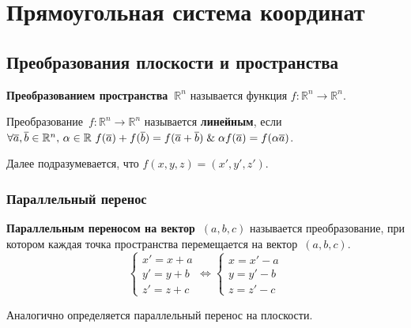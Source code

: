 \section{Прямоугольная система координат}
\subsection{Преобразования плоскости и пространства}
 \textbf{Преобразованием пространства~$\mathbb R^n$} называется функция $f \colon \mathbb R^n \to \mathbb R^n$.

Преобразование~$f \colon \mathbb R^n \to \mathbb R^n$ называется \textbf{линейным}, если $\forall \overline a, \overline b \in \mathbb R^n,\, \alpha \in \mathbb R \ f(\overline a) + f(\overline b) = f(\overline a + \overline b) \lAnd \alpha f(\overline a) \opbr= f(\alpha \overline a)$.

Далее подразумевается, что $f(x, y, z) = (x', y', z')$.

\subsubsection{Параллельный перенос}
 \textbf{Параллельным переносом на вектор~$(a, b, c)$} называется преобразование, при котором каждая точка пространства перемещается на вектор~$(a, b, c)$.
\begin{equation*}
\begin{cases}
x' = x + a \\
y' = y + b \\
z' = z + c
\end{cases} \Leftrightarrow
\begin{cases}
x = x' - a \\
y = y' - b \\
z = z' - c
\end{cases}
\end{equation*}

Аналогично определяется параллельный перенос на плоскости.

